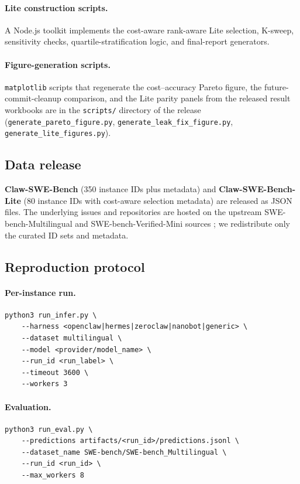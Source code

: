 \documentclass{llmxive}
\begin{document}
\paragraph{Lite construction scripts.} A Node.js toolkit implements the cost-aware rank-aware Lite selection, K-sweep, sensitivity checks, quartile-stratification logic, and final-report generators.

\paragraph{Figure-generation scripts.} \texttt{matplotlib} scripts that regenerate the cost--accuracy Pareto figure, the future-commit-cleanup comparison, and the Lite parity panels from the released result workbooks are in the \texttt{scripts/} directory of the release (\texttt{generate\_pareto\_figure.py}, \texttt{generate\_leak\_fix\_figure.py}, \texttt{generate\_lite\_figures.py}).

\subsection{Data release}

\textbf{Claw-SWE-Bench} (350 instance IDs plus metadata) and \textbf{Claw-SWE-Bench-Lite} (80 instance IDs with cost-aware selection metadata) are released as JSON files. The underlying issues and repositories are hosted on the upstream SWE-bench-Multilingual and SWE-bench-Verified-Mini sources \cite{swe_smith, swebench_verified_mini}; we redistribute only the curated ID sets and metadata.

\subsection{Reproduction protocol}

\paragraph{Per-instance run.}
\begin{verbatim}
python3 run_infer.py \
    --harness <openclaw|hermes|zeroclaw|nanobot|generic> \
    --dataset multilingual \
    --model <provider/model_name> \
    --run_id <run_label> \
    --timeout 3600 \
    --workers 3
\end{verbatim}

\paragraph{Evaluation.}
\begin{verbatim}
python3 run_eval.py \
    --predictions artifacts/<run_id>/predictions.jsonl \
    --dataset_name SWE-bench/SWE-bench_Multilingual \
    --run_id <run_id> \
    --max_workers 8
\end{verbatim}
\end{document}
